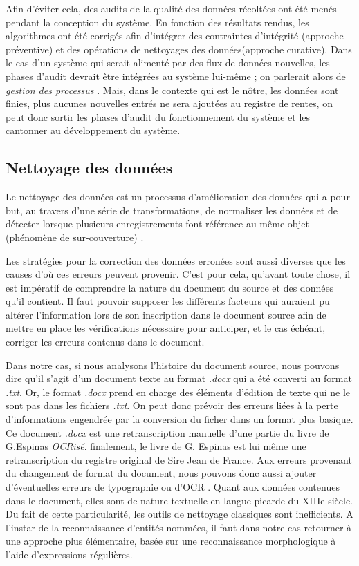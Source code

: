 Afin d'éviter cela, des audits de la qualité des données récoltées ont été menés pendant la conception du système. En fonction des résultats rendus, les algorithmes ont été corrigés afin d'intégrer des contraintes d'intégrité (approche préventive) et des opérations de nettoyages des données(approche curative).
Dans le cas d'un système qui serait alimenté par des flux de données nouvelles, les phases d'audit devrait être intégrées au système lui-même ; on parlerait alors de \textit{gestion des processus} \parencite{berti-equille_qualite_2004}. Mais, dans le contexte qui est le nôtre, les données sont finies, plus aucunes nouvelles entrés ne sera ajoutées au registre de rentes, on peut donc sortir les phases d'audit du fonctionnement du système et les cantonner au développement du système.

\subsection{Nettoyage des données}
Le nettoyage des données est un processus d'amélioration des données qui a pour but, au travers d'une série de transformations, de normaliser les données et de détecter lorsque plusieurs enregistrements font référence au même objet (phénomène de sur-couverture) \parencite{berti-equille_qualite_2004}.

Les stratégies pour la correction des données erronées sont aussi diverses que les causes d'où ces erreurs peuvent provenir. C'est pour cela, qu'avant toute chose, il est impératif de comprendre la nature du document du source et des données qu'il contient. Il faut pouvoir supposer les différents facteurs qui auraient pu altérer l'information lors de son inscription dans le document source afin de mettre en place les vérifications nécessaire pour anticiper, et le cas échéant, corriger les erreurs contenus dans le document.

Dans notre cas, si nous analysons \og l'histoire \fg{} du document source, nous pouvons dire qu'il s'agit d'un document texte au format \textit{.docx} qui  a été converti au format \textit{.txt}. Or, le format \textit{.docx} prend en charge des éléments d'édition de texte qui ne le sont pas dans les fichiers \textit{.txt}. On peut donc prévoir des erreurs liées à la perte d'informations engendrée par la conversion du ficher dans un format plus basique. 
Ce document \textit{.docx} est une retranscription manuelle d'une partie du livre de G.Espinas \textit{OCRisé}.
finalement, le livre de G. Espinas est lui même une retranscription du registre original de Sire Jean de France. Aux erreurs provenant du changement de format du document, nous pouvons donc aussi ajouter d'éventuelles erreurs de typographie ou d'OCR \parencite{berti-equille_qualite_2004}.
Quant aux données contenues dans le document, elles sont de nature textuelle en langue picarde du XIIIe siècle. Du fait de cette particularité, les outils de nettoyage classiques sont inefficients. A l'instar de la reconnaissance d'entités nommées, il faut dans notre cas retourner à une approche plus élémentaire, basée sur une reconnaissance morphologique à l'aide d'expressions régulières. 

